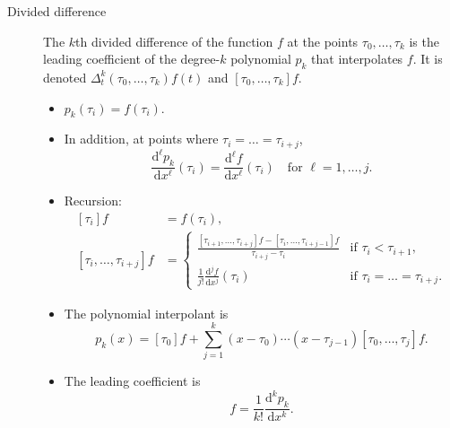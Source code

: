 \documentclass{article}
\newcommand{\md}{\mathrm{d}}
\begin{document}
\begin{description}
\begin{itemize}
  \end{itemize}

\item[Divided difference] The $k$th divided difference of the
  function $f$ at the points $\tau_0, \ldots, \tau_k$
  is the leading coefficient of the degree-$k$ polynomial $p_k$ that
  interpolates $f$.  It is denoted
  $\Delta_t^k (\tau_0, \ldots, \tau_k) f(t)$ and
  $[\tau_0, \ldots, \tau_k] f$.

  \begin{itemize}
  \item $p_k(\tau_i) = f(\tau_i)$.

  \item In addition, at points where
    $\tau_i = \ldots = \tau_{i+j}$,
    \begin{equation}
      \frac{\md^{\ell} p_k}{\md x^{\ell}}(\tau_i)
      = \frac{\md^{\ell} f}{\md x^{\ell}}(\tau_i)
      \quad \text{for $\ell = 1, \ldots, j$}.
    \end{equation}

  \item Recursion:
    \begin{equation}
      \begin{split}
        [\tau_i] f &= f(\tau_i),
        \\
        [\tau_i, \ldots, \tau_{i+j}] f
        &=
        \begin{cases}
          \frac{[\tau_{i+1}, \ldots, \tau_{i+j}] f
            - [\tau_i, \ldots, \tau_{i+j-1}] f}
          {\tau_{i+j} - \tau_i}
          & \text{if $\tau_i < \tau_{i + 1}$},
          \\
          \frac{1}{j!} \frac{\md^j f}{\md x^j}(\tau_i)
          & \text{if $\tau_i = \ldots = \tau_{i+j}$}.
        \end{cases}
      \end{split}
    \end{equation}

  \item The polynomial interpolant is
    \begin{equation}
      p_k(x) = [\tau_0] f
      + \sum_{j=1}^k (x - \tau_0) \cdots (x - \tau_{j-1})
      [\tau_0, \ldots, \tau_j] f.
    \end{equation}

  \item The leading coefficient is
    \begin{equation}
      [\tau_0, \ldots, \tau_k] f
      = \frac{1}{k!} \frac{\md^k p_k}{\md x^k}.
    \end{equation}


\end{itemize}
\end{description}
\end{document}
